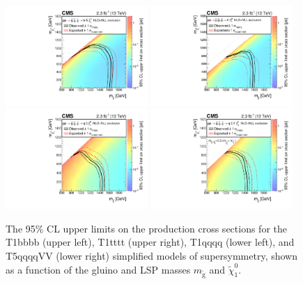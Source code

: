 \begin{figure}[htbp]
\centering
    \includegraphics[width=0.48\textwidth]{figures/SusySearches/Ra2b2015/SMSbbbbXSEC.pdf}
    \includegraphics[width=0.48\textwidth]{figures/SusySearches/Ra2b2015/SMSttttXSEC.pdf} \\
    \includegraphics[width=0.48\textwidth]{figures/SusySearches/Ra2b2015/SMSqqqqXSEC.pdf}
    \includegraphics[width=0.48\textwidth]{figures/SusySearches/Ra2b2015/SMSqqqqVVXSEC.pdf}
    \caption{
      The 95\% CL upper limits on the production
      cross sections for the T1bbbb (upper left),
      T1tttt (upper right), T1qqqq (lower left),
      and T5qqqqVV (lower right) simplified models of supersymmetry,
      shown as a function of the gluino and LSP masses $m_{\tilde{\text{g}}}$ and $\tilde{\chi}^{0}_{1}$.
}
\end{figure}
